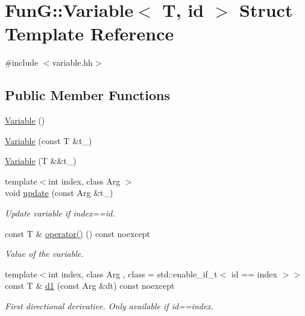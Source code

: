 \hypertarget{structFunG_1_1Variable}{\section{\-Fun\-G\-:\-:\-Variable$<$ \-T, id $>$ \-Struct \-Template \-Reference}
\label{structFunG_1_1Variable}
}


{\ttfamily \#include $<$variable.\-hh$>$}

\subsection*{\-Public \-Member \-Functions}
\begin{DoxyCompactItemize}
\item 
\hyperlink{structFunG_1_1Variable_a371877d545fcd45e7470819b4ece8918}{\-Variable} ()
\item 
\hyperlink{structFunG_1_1Variable_a10238450dac2ec4c98400b106543ff8f}{\-Variable} (const \-T \&t\-\_\-)
\item 
\hyperlink{structFunG_1_1Variable_a9abfae2c2ab06cbe2556600bae7c7ccb}{\-Variable} (\-T \&\&t\-\_\-)
\item 
{\footnotesize template$<$int index, class Arg $>$ }\\void \hyperlink{structFunG_1_1Variable_a50f4d34586aa6a89df604503e0a3c2a9}{update} (const \-Arg \&t\-\_\-)
\begin{DoxyCompactList}\small\item\em \-Update variable if index==id. \end{DoxyCompactList}\item 
const \-T \& \hyperlink{structFunG_1_1Variable_a84333150762e0e5472ab508ca3f26e4f}{operator()} () const noexcept
\begin{DoxyCompactList}\small\item\em \-Value of the variable. \end{DoxyCompactList}\item 
{\footnotesize template$<$int index, class Arg , class  = std\-::enable\-\_\-if\-\_\-t$<$ id == index $>$$>$ }\\const \-T \& \hyperlink{structFunG_1_1Variable_a9384160b4015767ffe6a058583fef10a}{d1} (const \-Arg \&dt) const noexcept
\begin{DoxyCompactList}\small\item\em \-First directional derivative. \-Only available if id==index. \end{DoxyCompactList}\end{DoxyCompactItemize}


